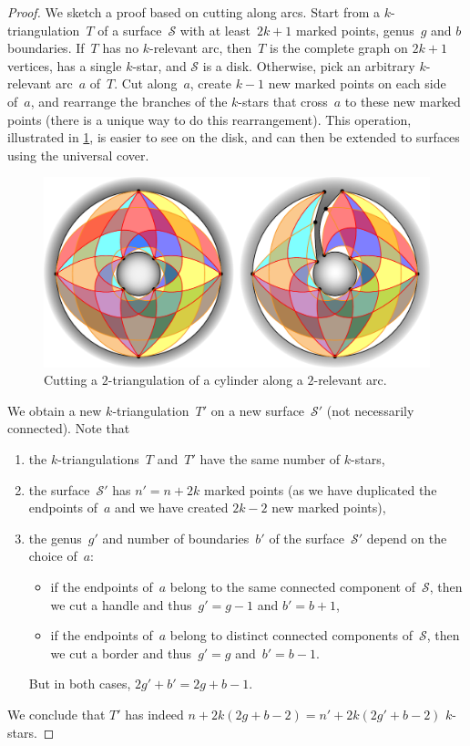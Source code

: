 \documentclass{amsart}
\theoremstyle{remark}
\newcommand{\surface}{\mathcal{S}}
\begin{document}
\begin{proof}
%
We sketch a proof based on cutting along arcs.
Start from a $k$-triangulation~$T$ of a surface~$\surface$ with at least~$2k+1$ marked points, genus~$g$ and $b$ boundaries.
If~$T$ has no $k$-relevant arc, then~$T$ is the complete graph on $2k+1$ vertices, has a single $k$-star, and $\surface$ is a disk.
Otherwise, pick an arbitrary $k$-relevant arc~$a$ of~$T$.
Cut along~$a$, create $k-1$ new marked points on each side of~$a$, and rearrange the branches of the $k$-stars that cross~$a$ to these new marked points (there is a unique way to do this rearrangement).
This operation, illustrated in \cref{fig:cutSurface}, is easier to see on the disk, and can then be extended to surfaces using the universal cover.
%
\begin{figure}[t]
	\capstart
	\centerline{\includegraphics[scale=.5]{2triangCylinderCut}}
	\caption{Cutting a $2$-triangulation of a cylinder along a $2$-relevant arc.}
	\label{fig:cutSurface}
\end{figure}
%
We obtain a new $k$-triangulation~$T'$ on a new surface~$\surface'$ (not necessarily connected).
Note that
\begin{enumerate}
\item the $k$-triangulations~$T$ and~$T'$ have the same number of $k$-stars,
\item the surface~$\surface'$ has $n' = n+2k$ marked points (as we have duplicated the endpoints of~$a$ and we have created $2k-2$ new marked points),
\item the genus~$g'$ and number of boundaries~$b'$ of the surface~$\surface'$ depend on the choice of~$a$:
	\begin{itemize}
	\item if the endpoints of~$a$ belong to the same connected component of~$\surface$, then we cut a handle and thus~$g' = g-1$ and $b' = b+1$,
	\item if the endpoints of~$a$ belong to distinct connected components of~$\surface$, then we cut a border and thus~$g' = g$ and~$b' = b-1$.
	\end{itemize}
	But in both cases, $2g'+b' = 2g+b-1$.
\end{enumerate}
We conclude that $T'$ has indeed $n + 2k(2g + b -2) = n' + 2k(2g' + b - 2)$ $k$-stars.


\end{proof}
\end{document}
